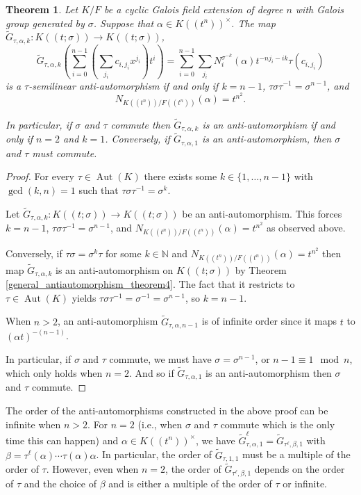 \documentclass{amsart}
\theoremstyle{plain}
\newtheorem{theorem}{Theorem}[section]
\theoremstyle{definition}
\numberwithin{equation}{section}
\numberwithin{figure}{section}
\newcommand{\N}{\mathbb{N}}
\DeclareMathOperator{\Aut}{Aut}
\begin{document}
   \begin{theorem} \label{thm:Patrelvant}
   Let $K/F$ be a cyclic Galois field extension of degree $n$ with Galois group generated by $\sigma$. Suppose that $\alpha\in K((t^n))^\times$.
   The map $\widetilde G_{\tau,\alpha,k}:K((t;\sigma))\to K((t;\sigma))$,
    $$
\widetilde  G_{\tau,\alpha,k}(\sum_{i=0}^{n-1}(\sum_{j_i}c_{i,{j_i}} x^{j_i}) t^i)  =  \sum_{i=0}^{n-1}\sum_{j_i} N_i^{\sigma^{-k}}(\alpha) t^{-n{j_i}-ik}\tau(c_{i,{j_i}})
$$
  is a $\tau$-semilinear anti-automorphism if and only if $k=n-1$, $\tau \sigma\tau^{-1}=\sigma^{n-1}$, and
  $$N_{K((t^n))/F((t^n))}(\alpha)=t^{n^2}.$$
  
 In particular, if $\sigma$ and $\tau$ commute then $\widetilde G_{\tau,\alpha,k}$ is an anti-automorphism if and only if $n=2$ and $k=1$. Conversely, if $\widetilde G_{\tau,\alpha,1}$ is an anti-automorphism, then $\sigma$ and $\tau$ must commute.
  \end{theorem}


\begin{proof}
 For every $\tau\in \Aut(K)$ there exists some
  $k\in \{1,\dots, n-1 \}$ with $\gcd (k, n)=1$ such that $\tau \sigma\tau^{-1}=\sigma^k$.

 Let $\widetilde G_{\tau,\alpha,k}:K((t;\sigma))\to K((t;\sigma))$ be an anti-automorphism.
  This forces $k=n-1$, $\tau \sigma\tau^{-1}=\sigma^{n-1}$, and $N_{K((t^n))/F((t^n))}(\alpha)=t^{n^2}$ as observed above.

 Conversely, if $\tau\sigma=\sigma^{k}\tau$ for some $k\in \N$ and  $N_{K((t^n))/F((t^n))}(\alpha)=t^{n^2}$ then map $\widetilde  G_{\tau,\alpha,k}$ is an anti-automorphism  on $K((t;\sigma))$ by Theorem \ref{general_antiautomorphism_theorem4}. The fact that it restricts to  $\tau\in\Aut(K)$ yields  $\tau \sigma \tau^{-1}=\sigma^{-1}=\sigma^{n-1}$, so $k=n-1$.

When $n>2$, an anti-automorphism $\widetilde G_{\tau,\alpha,n-1}$ is  of infinite order since it maps $t$ to $(\alpha t)^{-(n-1)}$.

In particular, if $\sigma$ and $\tau$ commute, we must have $\sigma=\sigma^{n-1}$, or  $n-1\equiv 1 \mod n$, which only holds when $n=2$.
And  so if $\widetilde  G_{\tau,\alpha,1}$ is an anti-automorphism then $\sigma$ and $\tau$ commute.
  \end{proof}

  The order of the anti-automorphisms constructed in the above proof can be infinite when $n>2$. For $n=2$ (i.e., when $\sigma$ and $\tau$ commute which is the only time this can happen) and  $\alpha\in K((t^n))^\times$, we have
 $\widetilde  G_{\tau,\alpha,1}^\ell = \widetilde  G_{\tau^\ell,\beta,1}$ with $\beta=\tau^\ell(\alpha)\cdots \tau(\alpha)\alpha$. In particular, the order of  $\widetilde G_{\tau,1,1} $ must be a multiple of the order of $\tau$. However, even when $n=2$, the order of $\widetilde  G_{\tau^\ell,\beta,1}$ depends on the order of $\tau$ and the choice of $\beta$ and is either a multiple of the order of $\tau$ or  infinite.
\end{document}
